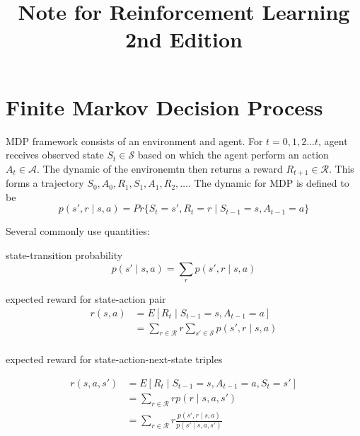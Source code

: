 \documentclass[twocolumn, 10pt]{article}
\title{Note for Reinforcement Learning 2nd Edition}
\newcommand{\actionset}{ \mathcal{A}}
\newcommand{\stateset}{\mathcal{S}}
\newcommand{\rewardset}{\mathcal{R}}
\begin{document}
\maketitle

\section*{Finite Markov Decision Process}

MDP framework consists of an environment  and agent. For $t=0,1,2...t$, agent  receives observed state $S_t  \in  \stateset$ based on which the agent perform an action $A_t \in \actionset$.  The dynamic of the environemtn  then returns a reward $R_{t+1} \in \rewardset$.  This forms a trajectory $S_0,A_0,R_1, S_1,A_1, R_2, \ldots$.  The dynamic for MDP is defined to be 
$$ p(s', r  \mid s, a) = Pr\{S_t = s', R_t = r  \mid  S_{t- 1} = s, A_{t-1} = a \} $$

Several commonly use quantities:

state-transition probability
$$ p(s' \mid  s, a) = \sum_r p(s', r \mid s, a)$$

expected reward for state-action pair
$$
\begin{aligned}
 r(s, a)  &= E[R_t \mid S_{t-1} = s, A_{t - 1} = a]  \\
                &=\sum_{r \in \rewardset} r  \sum_{s' \in \stateset} p(s', r \mid s, a) \\
 \end{aligned}
$$

expected reward for state-action-next-state triples 

$$
\begin{aligned}
r(s, a, s') &= E[R_t \mid S_{t-1} = s, A_{t-1} = a, S_t = s']  \\
                    &= \sum_{r \in \rewardset} r  p(r \mid s, a, s') \\
                    &= \sum_{r \in \rewardset} r  \frac{p(s', r \mid s, a) } {p(s' \mid s, a, s')}
\end{aligned}
$$
\end{document}
